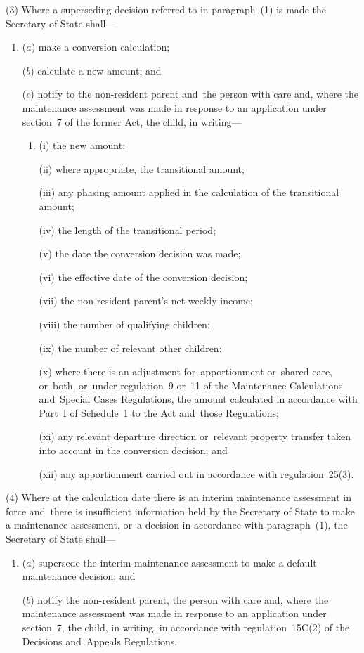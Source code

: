 \documentclass[12pt,a4paper]{article}
\begin{document}
(3) Where a superseding decision referred to in paragraph~(1) is made the Secretary of State shall—
\begin{enumerate}\item[]
($a$) make a conversion calculation;

($b$) calculate a new amount; and

($c$) notify to the non-resident parent and~the person with care and, where the maintenance assessment was made in response to an application under section~7 of the former Act, the child, in writing—
\begin{enumerate}\item[]
(i) the new amount;

(ii) where appropriate, the transitional amount;

(iii)  any phasing amount applied in the calculation of the transitional amount;

(iv) the length of the transitional period;

(v) the date the conversion decision was made;

(vi) the effective date of the conversion decision;

(vii) the non-resident parent’s net weekly income;

(viii) the number of qualifying children;

(ix) the number of relevant other children;

(x) where there is an adjustment for~apportionment or~shared care, or~both, or~under regulation~9 or~11 of the Maintenance Calculations and~Special Cases Regulations, the amount calculated in accordance with Part~I of Schedule~1 to the Act and~those Regulations;

(xi) any relevant departure direction or~relevant property transfer taken into account in the conversion decision; and

(xii) any apportionment carried out in accordance with regulation~25(3).
\end{enumerate}
\end{enumerate}

(4) Where at the calculation date there is an interim maintenance assessment in force and~there is insufficient information held by the Secretary of State to make a maintenance assessment, or~a decision in accordance with paragraph~(1), the Secretary of State shall—
\begin{enumerate}\item[]
($a$) supersede the interim maintenance assessment to make a default maintenance decision; and

($b$) notify the non-resident parent, the person with care and, where the maintenance assessment was made in response to an application under section~7, the child, in writing, in accordance with regulation~15C(2) of the Decisions and~Appeals Regulations.
\end{enumerate}
\end{document}
